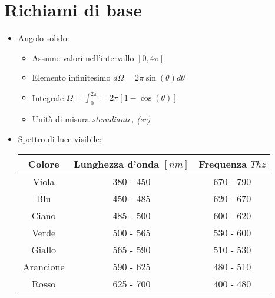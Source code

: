 \documentclass{article}
\begin{document}
\section{Richiami di base}
\begin{itemize}
  \item Angolo solido:
        \begin{itemize}
          \item Assume valori nell'intervallo \( [0, 4 \pi] \)
          \item Elemento infinitesimo \( d \Omega = 2 \pi \sin(\theta) d \theta \)
          \item Integrale \( \displaystyle \Omega = \int_0^{2 \pi} = 2 \pi \left[  1- \cos(\theta) \right] \)
          \item Unità di misura \textit{steradiante, (sr)}
        \end{itemize}
  \item Spettro di luce visibile:
        \vspace{0.5cm}
        \begin{table}[h]
          \centering
          \renewcommand{\arraystretch}{2}
          \begin{tabular}{|c|c|c|}
            \hline
            \textbf{Colore} & \textbf{Lunghezza d'onda \([nm]\)} & \textbf{Frequenza \(Thz\)} \\ \hline
            Viola           & 380 - 450                          & 670 - 790                  \\ \hline
            Blu             & 450 - 485                          & 620 - 670                  \\ \hline
            Ciano           & 485 - 500                          & 600 - 620                  \\ \hline
            Verde           & 500 - 565                          & 530 - 600                  \\ \hline
            Giallo          & 565 - 590                          & 510 - 530                  \\ \hline
            Arancione       & 590 - 625                          & 480 - 510                  \\ \hline
            Rosso           & 625 - 700                          & 400 - 480                  \\ \hline
          \end{tabular}
        \end{table}
\end{itemize}
\newpage
\end{document}
